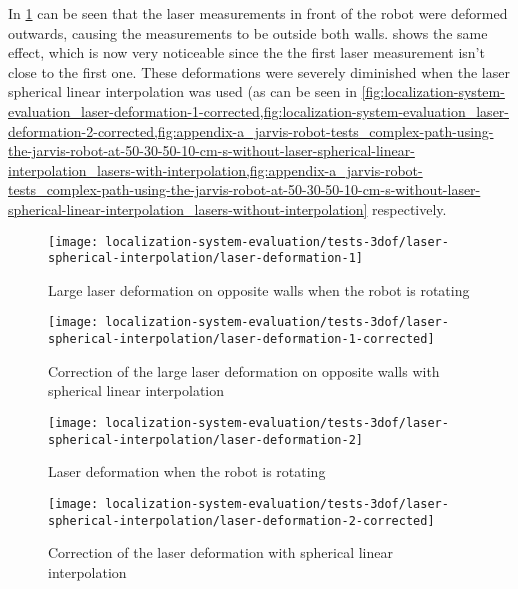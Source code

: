 In \cref{fig:localization-system-evaluation_laser-deformation-1} can be seen that the laser measurements in front of the robot were deformed outwards, causing the measurements to be outside both walls.  shows the same effect, which is now very noticeable since the the first laser measurement isn't close to the first one. These deformations were severely diminished when the laser spherical linear interpolation was used (as can be seen in \cref{fig:localization-system-evaluation_laser-deformation-1-corrected,fig:localization-system-evaluation_laser-deformation-2-corrected,fig:appendix-a_jarvis-robot-tests_complex-path-using-the-jarvis-robot-at-50-30-50-10-cm-s-without-laser-spherical-linear-interpolation_lasers-with-interpolation,fig:appendix-a_jarvis-robot-tests_complex-path-using-the-jarvis-robot-at-50-30-50-10-cm-s-without-laser-spherical-linear-interpolation_lasers-without-interpolation} respectively.


\begin{figure}[H]
	\centering
	\texttt{[image: localization-system-evaluation/tests-3dof/laser-spherical-interpolation/laser-deformation-1]}
	\caption{Large laser deformation on opposite walls when the robot is rotating}
	\label{fig:localization-system-evaluation_laser-deformation-1}
\end{figure}

\begin{figure}[H]
	\centering
	\texttt{[image: localization-system-evaluation/tests-3dof/laser-spherical-interpolation/laser-deformation-1-corrected]}
	\caption{Correction of the large laser deformation on opposite walls with spherical linear interpolation}
	\label{fig:localization-system-evaluation_laser-deformation-1-corrected}
\end{figure}


\begin{figure}[H]
	\centering
	\texttt{[image: localization-system-evaluation/tests-3dof/laser-spherical-interpolation/laser-deformation-2]}
	\caption{Laser deformation when the robot is rotating}
	\label{fig:localization-system-evaluation_laser-deformation-2}
\end{figure}

\begin{figure}[H]
	\centering
	\texttt{[image: localization-system-evaluation/tests-3dof/laser-spherical-interpolation/laser-deformation-2-corrected]}
	\caption{Correction of the laser deformation with spherical linear interpolation}
	\label{fig:localization-system-evaluation_laser-deformation-2-corrected}
\end{figure}



